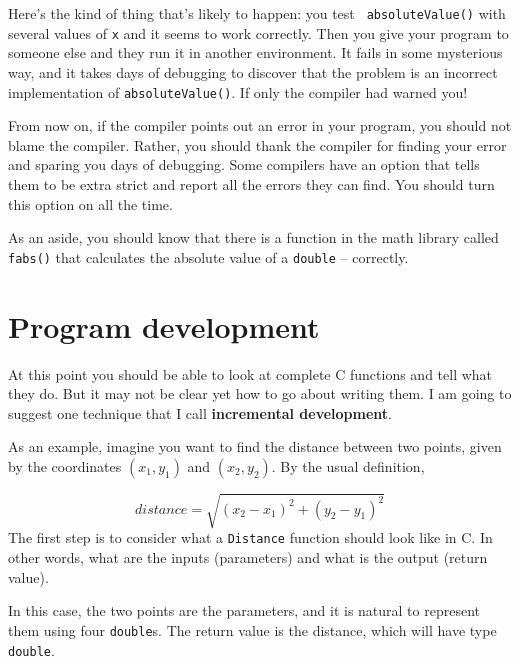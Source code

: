 Here's the kind of thing that's likely to happen: you test {\tt
absoluteValue()} with several values of {\tt x} and it seems to work
correctly.  Then you give your program to someone else and they run it
in another environment.  It fails in some mysterious way, and it
takes days of debugging to discover that the problem is an
incorrect implementation of {\tt absoluteValue()}.  If only the
compiler had warned you!


From now on, if the compiler points out an error in your program, you
should not blame the compiler.  Rather, you should thank the compiler
for finding your error and sparing you days of debugging.  Some
compilers have an option that tells them to be extra strict and report
all the errors they can find.  You should turn this option on all the
time.


As an aside, you should know that there is a function in the
math library called {\tt fabs()} that calculates the absolute
value of a {\tt double} -- correctly.

\section{Program development}
\label{distance}

At this point you should be able to look at complete C functions
and tell what they do.  But it may not be clear yet how to go
about writing them.  I am going to suggest one technique that
I call {\bf incremental development}.


As an example, imagine you want to find the distance between two
points, given by the coordinates $(x_1, y_1)$ and $(x_2, y_2)$.  By
the usual definition,

\begin{equation}
distance = \sqrt{(x_2 - x_1)^2 + (y_2 - y_1)^2}
\end{equation}
%
The first step is to consider what a {\tt Distance} function
should look like in C.  In other words, what are the inputs
(parameters) and what is the output (return value).

In this case, the two points are the parameters, and it is natural to
represent them using four {\tt double}s.  The return value is the
distance, which will have type {\tt double}.

